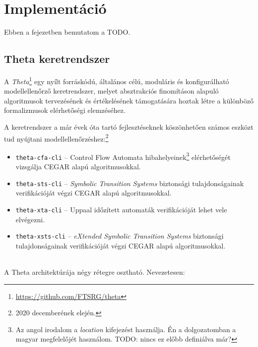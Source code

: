\chapter{Implementáció}

Ebben a fejezetben bemutatom a TODO.

\section{Theta keretrendszer}
\label{sec:theta_keretrendszer}

A \emph{Theta}\footnote{\url{https://github.com/FTSRG/theta}} egy nyílt forráskódú, általános célú, moduláris és konfigurálható modellellenőrző keretrendszer, melyet absztrakciós finomításon alapuló algoritmusok tervezésének és értékelésének támogatására hoztak létre a különböző formalizmusok elérhetőségi elemzéséhez.

A keretrendszer a már évek óta tartó fejlesztéseknek köszönhetően számos eszközt tud nyújtani modellellenőrzéshez:\footnote{2020 decemberének elején.}

\begin{itemize}
	\item \verb+theta-cfa-cli+ -- Control Flow Automata hibahelyeinek\footnote{Az angol irodalom a \emph{location} kifejezést használja. Én a dolgozatomban a magyar megfelelőjét használom. TODO: nincs ez előbb definiálva már?} elérhetőségét vizsgálja CEGAR alapú algoritmusokkal.
	
	\item \verb+theta-sts-cli+ -- \emph{Symbolic Transition Systems} biztonsági tulajdonságainak verifikációját végzi CEGAR alapú algoritmusokkal.
	
	\item \verb+theta-xta-cli+ -- Uppaal időzített automaták verifikációját lehet vele elvégezni.
	
	\item \verb+theta-xsts-cli+ -- \emph{eXtended Symbolic Transition Systems} biztonsági tulajdonságainak verifikációját végzi CEGAR alapú algoritmusokkal.
\end{itemize}
\ \\
A Theta architektúrája négy rétegre osztható. Nevezetesen:

